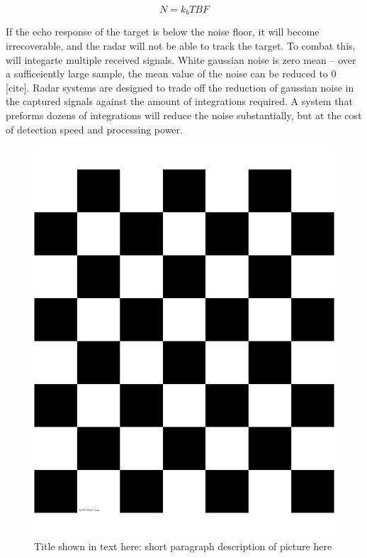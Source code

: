 \begin{equation}\label{eq:noise_floor}
	N = k_b T B F
\end{equation}

If the echo response of the target is below the noise floor, it will become irrecoverable, and the radar will not be able to track the target. To combat this, will integarte multiple received signals. White gaussian noise is zero mean -- over a sufficeiently large sample, the mean value of the noise can be reduced to 0 [cite]. Radar systems are designed to trade off the reduction of gaussian noise in the captured signals against the amount of integrations required. A system that preforms dozens of integrations will reduce the noise substantially, but at the cost of detection speed and processing power.


	\begin{figure}[tb!] %
		\centering
		\includegraphics[width = 0.75\columnwidth]{Figures/checkerboard7x6x50x50cm.png}
		\caption[TOC Figure Name]{Title shown in text here: short paragraph description of picture here}
		\label{fig:examplePicture}
	\end{figure}

